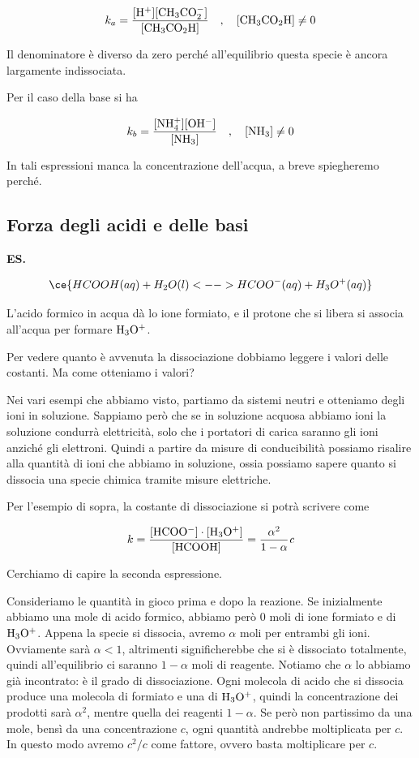 $$k_a=\rm{\frac{[H^+][CH_3CO_2^-]}{[CH_3CO_2H]}}
\quad,\quad
[CH_3CO_2H] \neq 0$$

Il denominatore è diverso da zero perché all'equilibrio questa specie è ancora largamente indissociata.

Per il caso della base si ha

$$k_b=\rm{\frac{[NH_4^+][OH^-]}{[NH_3]}}
\quad,\quad
[NH_3] \neq 0$$

In tali espressioni manca la concentrazione dell'acqua, a breve spiegheremo perché.
\subsection{Forza degli acidi e delle basi}
\textbf{ES.}

$$\ce{HCOOH(aq) + H_2O(l) <--> HCOO^-(aq) + H_3O^+(aq)}$$

L'acido formico in acqua dà lo ione formiato, e il protone che si libera si associa all'acqua per formare $\rm H_3O^+$.

Per vedere quanto è avvenuta la dissociazione dobbiamo leggere i valori delle costanti. Ma come otteniamo i valori?

Nei vari esempi che abbiamo visto, partiamo da sistemi neutri e otteniamo degli ioni in soluzione. Sappiamo però che se in soluzione acquosa abbiamo ioni la soluzione condurrà elettricità, solo che i portatori di carica saranno gli ioni anziché gli elettroni. Quindi a partire da misure di conducibilità possiamo risalire alla quantità di ioni che abbiamo in soluzione, ossia possiamo sapere quanto si dissocia una specie chimica tramite misure elettriche.

Per l'esempio di sopra, la costante di dissociazione si potrà scrivere come

$$k= \rm{\frac{[HCOO^-]\cdot[H_3O^+]}{[HCOOH]}} = \frac{\alpha^2}{1- \alpha}\textit{c}$$

Cerchiamo di capire la seconda espressione.

Consideriamo le quantità in gioco prima e dopo la reazione. Se inizialmente abbiamo una mole di acido formico, abbiamo però 0 moli di ione formiato e di $\rm H_3O^+$. Appena la specie si dissocia, avremo $\alpha$ moli per entrambi gli ioni. Ovviamente sarà $\alpha<1$, altrimenti significherebbe che si è dissociato totalmente, quindi all'equilibrio ci saranno $1-\alpha$ moli di reagente. Notiamo che $\alpha$ lo abbiamo già incontrato: è il grado di dissociazione. Ogni molecola di acido che si dissocia produce una molecola di formiato e una di $\rm H_3O^+$, quindi la concentrazione dei prodotti sarà $\alpha^2$, mentre quella dei reagenti $1-\alpha$. Se però non partissimo da una mole, bensì da una concentrazione $c$, ogni quantità andrebbe moltiplicata per $c$. In questo modo avremo $c^2/c$ come fattore, ovvero basta moltiplicare per $c$.

